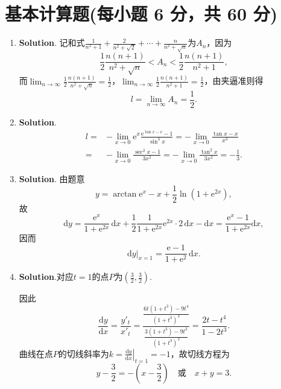 \documentclass[../main.tex]{subfiles}
\begin{document}
\section{基本计算题(每小题 6 分，共 60 分)}
\begin{enumerate}
    \item \textbf{Solution}. 记和式$\frac{1}{n^{2}+1}+\frac{2}{n^{2}+\sqrt{2}}+\cdots
              +\frac{n}{n^{2}+\sqrt{n}}$为$A_{n}$，因为
          \[
              \frac{1}{2}\frac{n(n+1)}{n^{2}+\sqrt{n}}<A_{n}<\frac{1}{2}\frac{n(n+1)}{n^{2}+1}
              ,
          \]
          而$\lim_{n\to\infty}\frac{1}{2}\frac{n(n+1)}{n^{2}+\sqrt{n}}=\frac{1}{2}$，$\lim
              _{n\to\infty}\frac{1}{2}\frac{n(n+1)}{n^{2}+1}=\frac{1}{2}$，由夹逼准则得
          \[
              l=\lim_{n\to\infty}A_{n}=\frac{1}{2}.
          \]

    \item \textbf{Solution}.
          \[
              \begin{aligned}
                  l= {} & -\lim_{x\to 0}\mathrm{e}^{x}\frac{\mathrm{e}^{\tan x-x}-1}{\sin^3 x}=-\lim_{x\to0}\frac{\tan x-x}{x^3} \\
                  = {}  & -\lim_{x\to0}\frac{\sec ^2 x-1}{3x^2}=-\lim_{x\to0}\frac{\tan^2 x}{3x^2}=-\frac{1}{3}.
              \end{aligned}
          \]

    \item \textbf{Solution}.
          由题意
          \[
              y=\arctan \mathrm{e}^{x} -x+\frac{1}{2}\ln(1+\mathrm{e}^{2x}),
          \]
          故
          \[
              \mathrm{d}y=\frac{\mathrm{e}^{x}}{1+\mathrm{e}^{2x}}\,\mathrm{d}x+\frac{1}{2}
              \frac{1}{1+\mathrm{e}^{2x}}\mathrm{e}^{2x}\cdot2\,\mathrm{d}x-\mathrm{d}x=\frac{\mathrm{e}^{x}-1}{1+\mathrm{e}^{2x}}
              \mathrm{d}x,
          \]
          因而
          \[
              \mathrm{d}y\big |_{x=1}=\frac{\mathrm{e}-1}{1+\mathrm{e}^{2}}\,\mathrm{d}x.
          \]

    \item \textbf{Solution}.对应$t=1$的点$P$为$\left(\frac{3}{2},\frac{3}{2}\right
              )$.

          因此
          \[
              \frac{\mathrm{d}y}{\mathrm{d}x}=\frac{y'_{t}}{x'_{t}}=\frac{\frac{6t(1+t^{3})-9t^{4}}{(1+t^{3})^{2}}}{\frac{3(1+t^{3})-9t^{3}}{(1+t^{3})^{2}}}=\frac{2t-t^{4}}{1-2t^{3}}.
          \]
          曲线在点$P$的切线斜率为$k=\left.\frac{\mathrm{d}y}{\mathrm{d}x}\right|_{t=1}
              =-1$，故切线方程为
          \[
              y-\frac{3}{2}=-\left(x-\frac{3}{2}\right)\quad\text{或}\quad x+y=3.
          \]


\end{enumerate}
\end{document}
